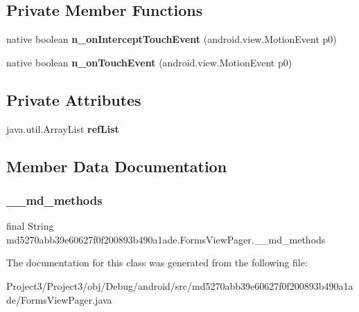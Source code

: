 \subsection*{Private Member Functions}
\begin{DoxyCompactItemize}
\item 
\mbox{\label{classmd5270abb39e60627f0f200893b490a1ade_1_1FormsViewPager_a706a9c5163c73d9886ea08cb42e617ed}} 
native boolean {\bfseries n\+\_\+on\+Intercept\+Touch\+Event} (android.\+view.\+Motion\+Event p0)
\item 
\mbox{\label{classmd5270abb39e60627f0f200893b490a1ade_1_1FormsViewPager_a250aed5e9b562880e22f64d879528867}} 
native boolean {\bfseries n\+\_\+on\+Touch\+Event} (android.\+view.\+Motion\+Event p0)
\end{DoxyCompactItemize}
\subsection*{Private Attributes}
\begin{DoxyCompactItemize}
\item 
\mbox{\label{classmd5270abb39e60627f0f200893b490a1ade_1_1FormsViewPager_a5a614138d55f15c99829c6d967ad7a1d}} 
java.\+util.\+Array\+List {\bfseries ref\+List}
\end{DoxyCompactItemize}


\subsection{Member Data Documentation}
\mbox{\label{classmd5270abb39e60627f0f200893b490a1ade_1_1FormsViewPager_a0afe4852089db54f50fdcd4673a3538f}} 
\subsubsection{\texorpdfstring{\+\_\+\+\_\+md\+\_\+methods}{\_\_md\_methods}}
{\footnotesize\ttfamily final String md5270abb39e60627f0f200893b490a1ade.\+Forms\+View\+Pager.\+\_\+\+\_\+md\+\_\+methods\hspace{0.3cm}{\ttfamily [static]}}



The documentation for this class was generated from the following file\+:\begin{DoxyCompactItemize}
\item 
Project3/\+Project3/obj/\+Debug/android/src/md5270abb39e60627f0f200893b490a1ade/Forms\+View\+Pager.\+java\end{DoxyCompactItemize}
